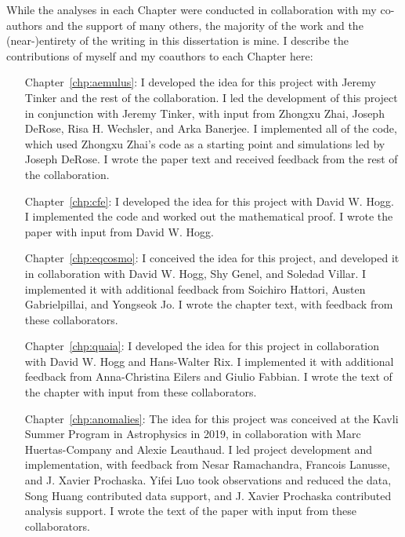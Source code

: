 While the analyses in each Chapter were conducted in collaboration with my co-authors and the support of many others, the majority of the work and the (near-)entirety of the writing in this dissertation is mine. 
I describe the contributions of myself and my coauthors to each Chapter here:
\begin{enumerate}[leftmargin=4\parindent]
    \item[Chapter~\ref{chp:aemulus}:] I developed the idea for this project with Jeremy Tinker and the rest of the \aemulus collaboration. I led the development of this project in conjunction with Jeremy Tinker, with input from Zhongxu Zhai, Joseph DeRose, Risa H. Wechsler, and Arka Banerjee. I implemented all of the code, which used Zhongxu Zhai's code as a starting point and simulations led by Joseph DeRose. I wrote the paper text and received feedback from the rest of the collaboration.
    \item[Chapter~\ref{chp:cfe}:] I developed the idea for this project with David W. Hogg. I implemented the code and worked out the mathematical proof. I wrote the paper with input from David W. Hogg.
    \item[Chapter~\ref{chp:eqcosmo}:] I conceived the idea for this project, and developed it in collaboration with David W. Hogg, Shy Genel, and Soledad Villar. I implemented it with additional feedback from Soichiro Hattori, Austen Gabrielpillai, and Yongseok Jo. I wrote the chapter text, with feedback from these collaborators.
    \item[Chapter~\ref{chp:quaia}:] I developed the idea for this project in collaboration with David W. Hogg and Hans-Walter Rix. I implemented it with additional feedback from Anna-Christina Eilers and Giulio Fabbian. I wrote the text of the chapter with input from these collaborators.
    \item[Chapter~\ref{chp:anomalies}:] The idea for this project was conceived at the Kavli Summer Program in Astrophysics in 2019, in collaboration with Marc Huertas-Company and Alexie Leauthaud. I led project development and implementation, with feedback from Nesar Ramachandra, Francois Lanusse, and J. Xavier Prochaska. Yifei Luo took observations and reduced the data, Song Huang contributed data support, and J. Xavier Prochaska contributed analysis support. I wrote the text of the paper with input from these collaborators.
\end{enumerate}


